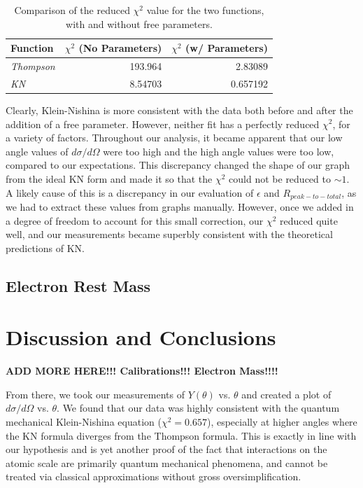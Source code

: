 \documentclass[%
 reprint,
 amsmath,amssymb,
 aps,
 pra,
]{revtex4-1}
\begin{document}
\begin{table}[htbp]
	\begin{center}
		\begin{tabular}{|l|r|r|}
			\hline
			Function & \multicolumn{1}{l|}{$\chi^2$ (No Parameters)} & \multicolumn{1}{l|}{$\chi^2$ (w/ Parameters)} \\ \hline
			\textit{Thompson} & 193.964 & 2.83089 \\ \hline
			\textit{KN} & 8.54703 & 0.657192 \\ \hline
		\end{tabular}
	\end{center}
	\caption{Comparison of the reduced $\chi^2$ value for the two functions, with and without free parameters.}
	\label{table:chi_square}
\end{table}

\noindent Clearly, Klein-Nishina is more consistent with the data both before and after the addition of a free parameter. However, neither fit has a perfectly reduced $\chi^2$, for a variety of factors. Throughout our analysis, it became apparent that our low angle values of $d\sigma / d\Omega$ were too high and the high angle values were too low, compared to our expectations. This discrepancy changed the shape of our graph from the ideal KN form and made it so that the $\chi^2$ could not be reduced to $\sim 1$. A likely cause of this is a discrepancy in our evaluation of $\epsilon$ and $R_{peak-to-total}$, as we had to extract these values from graphs manually. However, once we added in a degree of freedom to account for this small correction, our $\chi^2$ reduced quite well, and our measurements became superbly consistent with the theoretical predictions of KN.

\subsection{Electron Rest Mass}

\section{Discussion and Conclusions}
\textbf{ADD MORE HERE!!! Calibrations!!! Electron Mass!!!!}

From there, we took our measurements of $Y(\theta)$ vs. $\theta$ and created a plot of $d\sigma / d\Omega$ vs. $\theta$. We found that our data was highly consistent with the quantum mechanical Klein-Nishina equation ($\chi^2 = 0.657$), especially at higher angles where the KN formula diverges from the Thompson formula. This is exactly in line with our hypothesis and is yet another proof of the fact that interactions on the atomic scale are primarily quantum mechanical phenomena, and cannot be treated via classical approximations without gross oversimplification.
\end{document}
